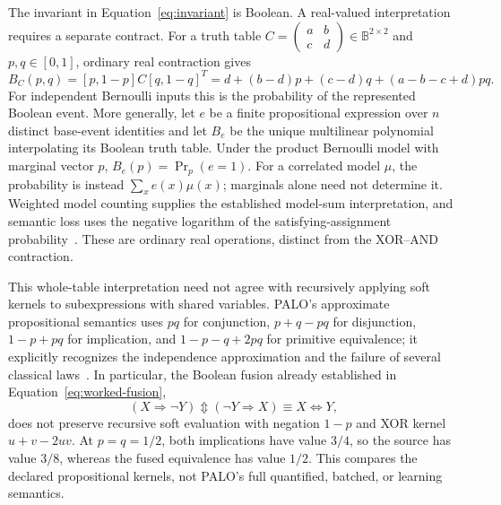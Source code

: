 \documentclass[10pt]{article}
\newcommand{\B}{\mathbb B}
\newcommand{\bxor}{\mathbin{\Updownarrow}}
\theoremstyle{plain}
\theoremstyle{definition}
\theoremstyle{remark}
\begin{document}
The invariant in Equation~\eqref{eq:invariant} is Boolean. A real-valued interpretation requires a separate contract. For a truth table $C=\left(\begin{smallmatrix}a&b\\c&d\end{smallmatrix}\right)\in\B^{2\times2}$ and $p,q\in[0,1]$, ordinary real contraction gives
\begin{equation}
 B_C(p,q)=[p,1-p]C[q,1-q]^T
 =d+(b-d)p+(c-d)q+(a-b-c+d)pq.
 \label{eq:soft-contraction}
\end{equation}
For independent Bernoulli inputs this is the probability of the represented Boolean event. More generally, let $e$ be a finite propositional expression over $n$ distinct base-event identities and let $B_e$ be the unique multilinear polynomial interpolating its Boolean truth table. Under the product Bernoulli model with marginal vector $p$, $B_e(p)=\Pr_p(e=1)$. For a correlated model $\mu$, the probability is instead $\sum_x e(x)\mu(x)$; marginals alone need not determine it. Weighted model counting supplies the established model-sum interpretation, and semantic loss uses the negative logarithm of the satisfying-assignment probability~\cite{Kimmig2017,Xu2018}. These are ordinary real operations, distinct from the XOR--AND contraction.

This whole-table interpretation need not agree with recursively applying soft kernels to subexpressions with shared variables. PALO's approximate propositional semantics uses $pq$ for conjunction, $p+q-pq$ for disjunction, $1-p+pq$ for implication, and $1-p-q+2pq$ for primitive equivalence; it explicitly recognizes the independence approximation and the failure of several classical laws~\cite[Sections~3.2, 3.5--3.6]{Stehr2022}. In particular, the Boolean fusion already established in Equation~\eqref{eq:worked-fusion},
\[
 (X\Rightarrow\neg Y)\bxor(\neg Y\Rightarrow X)\equiv X\Leftrightarrow Y,
\]
does not preserve recursive soft evaluation with negation $1-p$ and XOR kernel $u+v-2uv$. At $p=q=1/2$, both implications have value $3/4$, so the source has value $3/8$, whereas the fused equivalence has value $1/2$. This compares the declared propositional kernels, not PALO's full quantified, batched, or learning semantics.
\end{document}

